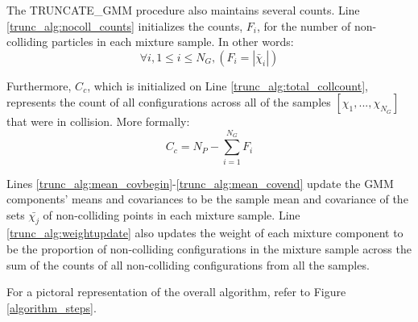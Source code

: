 \documentclass[journal]{IEEEtran}
\begin{document}
The TRUNCATE\_GMM procedure also maintains several counts. Line \ref{trunc_alg:nocoll_counts} initializes the counts, $F_i$, for the number of non-colliding particles in each mixture sample. In other words:
$$\forall i, 1 \leq i \leq N_{G}, ( F_i = |\bar{\chi}_i|)$$

Furthermore, $C_c$, which is initialized on Line \ref{trunc_alg:total_collcount}, represents the count of all configurations across all of the samples $[\chi_1,...,\chi_{N_G}]$ that were in collision. More formally:
$$C_c = N_{P} - \sum_{i=1}^{N_G}F_i$$

Lines \ref{trunc_alg:mean_covbegin}-\ref{trunc_alg:mean_covend} update the GMM components' means and covariances to be the sample mean and covariance of the sets $\bar{\chi_j}$ of non-colliding points in each mixture sample. Line \ref{trunc_alg:weightupdate} also updates the weight of each mixture component to be the proportion of non-colliding configurations in the mixture sample across the sum of the counts of all non-colliding configurations from all the samples.

For a pictoral representation of the overall algorithm, refer to Figure \ref{algorithm_steps}.



\renewcommand{\algorithmicrequire}{\textbf{Input:}}
\renewcommand{\algorithmicensure}{\textbf{Output:}}

\renewcommand{\algorithmicrequire}{\textbf{Input:}}
\renewcommand{\algorithmicensure}{\textbf{Output:}}
\end{document}

